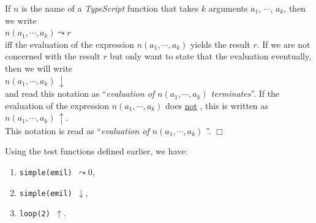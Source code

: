 \begin{Notation}[$\leadsto$, $\downarrow$, $\uparrow$]
If $n$ is the name of a \textsl{TypeScript} function that takes $k$ arguments $a_1$, $\cdots$, $a_k$,
then we write 
\\[0.2cm]
\hspace*{1.3cm}
 $n(a_1, \cdots, a_k) \leadsto r$ 
\\[0.2cm]
iff the evaluation of the expression $n(a_1, \cdots, a_k)$ yields the result $r$.
If we are not
concerned with the result $r$ but only want to state that the evaluation  eventually,
then we will write
\\[0.2cm]
\hspace*{1.3cm} $n(a_1, \cdots, a_k) \,\downarrow$ \\[0.3cm]
and read this notation as ``\emph{evaluation of $n(a_1, \cdots, a_k)$ terminates}''.
If the evaluation of the expression $n(a_1, \cdots, a_k)$ does \underline{not} , this is
written as \\[0.2cm]
\hspace*{1.3cm}
 $n(a_1, \cdots, a_k) \,\uparrow$.
\\[0.2cm]
This notation is read as ``\emph{evaluation of $n(a_1, \cdots, a_k)$ }''.
\hspace*{\fill} $\Box$
\end{Notation}

\examplesEng  Using the test functions defined earlier, we have:
\begin{enumerate}
\item {\tt simple(emil) $\leadsto 0$},
\item {\tt simple(emil) $\downarrow$},
\item {\tt loop(2) $\uparrow$}.
\end{enumerate}

